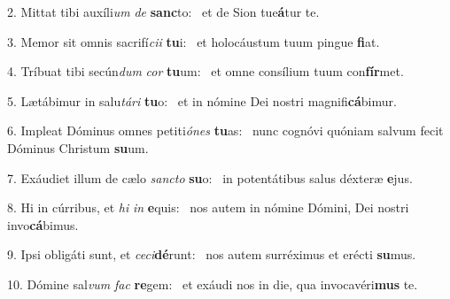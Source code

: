 2. Mittat tibi auxíli\textit{um} \textit{de} \textbf{sanc}to: \ast\  et de Sion tue\textbf{á}tur te.\

3. Memor sit omnis sacrifí\textit{ci}\textit{i} \textbf{tu}i: \ast\  et holocáustum tuum pingue \textbf{fi}at.\

4. Tríbuat tibi secún\textit{dum} \textit{cor} \textbf{tu}um: \ast\  et omne consílium tuum con\textbf{fír}met.\

5. Lætábimur in salu\textit{tá}\textit{ri} \textbf{tu}o: \ast\  et in nómine Dei nostri magnifi\textbf{cá}bimur.\

6. Impleat Dóminus omnes petiti\textit{ó}\textit{nes} \textbf{tu}as: \ast\  nunc cognóvi quóniam salvum fecit Dóminus Christum \textbf{su}um.\

7. Exáudiet illum de cælo \textit{sanc}\textit{to} \textbf{su}o: \ast\  in potentátibus salus déxteræ \textbf{e}jus.\

8. Hi in cúrribus, et \textit{hi} \textit{in} \textbf{e}quis: \ast\  nos autem in nómine Dómini, Dei nostri invo\textbf{cá}bimus.\

9. Ipsi obligáti sunt, et \textit{ce}\textit{ci}\textbf{dé}runt: \ast\  nos autem surréximus et erécti \textbf{su}mus.\

10. Dómine sal\textit{vum} \textit{fac} \textbf{re}gem: \ast\  et exáudi nos in die, qua invocavéri\textbf{mus} te.\

